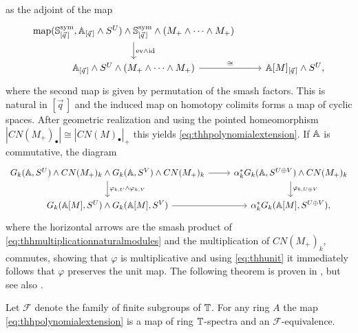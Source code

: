 as the adjoint of the map
\begin{equation}
\begin{tikzcd}
 \map(\spherespectrum^{\mathrm{sym}}_{[\vec{q}\,]}, \A_{[\vec{q}\,]}\wedge S^U)
\wedge \spherespectrum^{\mathrm{sym}}_{[\vec{q}\,]}
\wedge (M_+\wedge\cdots\wedge M_+)
\arrow{d}{\mathrm{ev}\wedge \mathrm{id}}\\
\A_{[\vec{q}\,]}\wedge S^U \wedge( M_+\wedge\cdots\wedge M_+)
\arrow{r}{\cong}
&\A[M]_{[\vec{q}\,]}\wedge S^U,
\end{tikzcd}
\end{equation}
where the second map is given by permutation of the smash factors. This is
natural in $[\vec{q}\,]$ and the induced map on homotopy colimits forms
a map of cyclic spaces. After geometric realization and using
the pointed homeomorphism $|CN(M_+)_\bullet|\cong |CN(M)_\bullet|_+$ this yields
\eqref{eq:thhpolynomialextension}. If $\mathbb{A}$ is commutative,
the diagram
\[
\begin{tikzcd}
G_k(\A, S^U)\wedge CN(M_+)_k\wedge G_k(\A, S^V)\wedge CN(M_+)_k
\arrow{r}\arrow{d}{\varphi_{k,U}\wedge \varphi_{k,V}}
&\alpha_k^\ast G_k(\A, S^{U\oplus V})\wedge CN(M_+)_k
\arrow{d}{\varphi_{k, U\oplus V}}\\
G_k(\A[M], S^U)\wedge  G_k(\A[M], S^V)
\arrow{r}
&\alpha_k^\ast G_k(\A[M], S^{U\oplus V}),
\end{tikzcd}
\]
where the horizontal arrows are the smash product of
\eqref{eq:thhmultiplicationnaturalmodules} and the multiplication of $CN(M_+)_k$, 
commutes, showing that $\varphi$ is multiplicative and using \eqref{eq:thhunit}
it immediately follows that
$\varphi$ preserves the unit map. The following theorem is proven in
\cite[Theorem~7.1, \pno~81]{hmperfect}, but see also \cite[Proposition~3, \pno~81]{hesselholthandbook}.
\begin{thm}\label{thm:polynomialextension}
Let $\mathcal{F}$ denote the family of finite subgroups of $\mathbb{T}$.
For any ring $A$ the map \eqref{eq:thhpolynomialextension}
is a map of ring $\mathbb{T}$-spectra and an $\mathcal{F}$-equivalence.
\end{thm}


